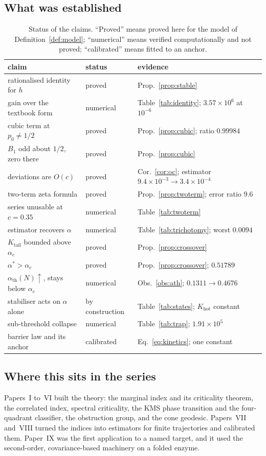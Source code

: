 \documentclass[11pt,reqno]{amsart}
\theoremstyle{plain}
\theoremstyle{definition}
\theoremstyle{remark}
\numberwithin{equation}{section}
\newcommand{\Kt}{K_{\mathrm{tail}}}
\newcommand{\Khot}{K_{\mathrm{hot}}}
\newcommand{\ac}{\alpha_c}
\newcommand{\ath}{\alpha_{\mathrm{th}}}
\begin{document}
\subsection{What was established}

\begin{table}[ht]
\centering\small\setlength{\tabcolsep}{5pt}
\caption{Status of the claims. ``Proved'' means proved here for the model of Definition~\ref{def:model}; ``numerical'' means verified computationally and not proved; ``calibrated'' means fitted to an anchor.}
\label{tab:assess}
\begin{tabular}{@{}l l l@{}}
\toprule
claim & status & evidence\\
\midrule
rationalised identity for $h$ & proved & Prop.~\ref{prop:stable}\\
gain over the textbook form & numerical & Table~\ref{tab:identity}; $3.57\times10^{6}$ at $10^{-6}$\\
cubic term at $p_0\ne1/2$ & proved & Prop.~\ref{prop:cubic}; ratio $0.99984$\\
$B_1$ odd about $1/2$, zero there & proved & Prop.~\ref{prop:cubic}\\
deviations are $O(c)$ & proved & Cor.~\ref{cor:oc}; estimator $9.4\times10^{-3}\!\to\!3.4\times10^{-4}$\\
two-term zeta formula & proved & Prop.~\ref{prop:twoterm}; error ratio $9.6$\\
series unusable at $c=0.35$ & numerical & Table~\ref{tab:twoterm}\\
estimator recovers $\alpha$ & numerical & Table~\ref{tab:trichotomy}; worst $0.0094$\\
$\Kt$ bounded above $\ac$ & proved & Prop.~\ref{prop:crossover}\\
$\alpha^\ast>\ac$ & proved & Prop.~\ref{prop:crossover}; $0.51789$\\
$\ath(N)\uparrow$, stays below $\ac$ & numerical & Obs.~\ref{obs:ath}; $0.1311\to0.4676$\\
stabiliser acts on $\alpha$ alone & by construction & Table~\ref{tab:states}; $\Khot$ constant\\
sub-threshold collapse & numerical & Table~\ref{tab:trap}; $1.91\times10^{5}$\\
barrier law and its anchor & calibrated & Eq.~\eqref{eq:kinetics}; one constant\\
\bottomrule
\end{tabular}
\end{table}

\subsection{Where this sits in the series}
Papers~I to~VI built the theory: the marginal index and its criticality theorem, the correlated index, spectral criticality, the KMS phase transition and the four-quadrant classifier, the obstruction group, and the cone geodesic. Papers~VII and~VIII turned the indices into estimators for finite trajectories and calibrated them. Paper~IX was the first application to a named target, and it used the second-order, covariance-based machinery on a folded enzyme.
\end{document}
